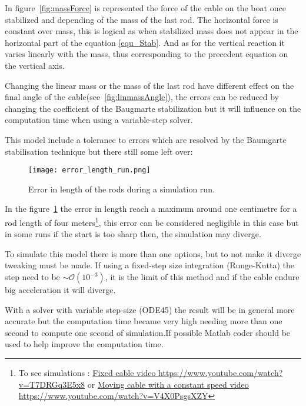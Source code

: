 In figure~\ref{fig:massForce} is represented the force of the cable on the boat once stabilized and depending of the mass of the last rod. The horizontal force is constant over mass, this is logical as when stabilized mass does not appear in the horizontal part of the equation \eqref{equ_Stab}. And as for the vertical reaction it varies linearly with the mass, thus corresponding to the precedent equation on the vertical axis.

Changing the linear mass or the mass of the last rod have different effect on the final angle of the cable(see~\ref{fig:linmassAngle}), the errors can be reduced by changing the coefficient of the Baugmarte stabilization but it will influence on the computation time when using a variable-step solver.

This model include a tolerance to errors which are resolved by the Baumgarte stabilisation technique but there still some left over:


\begin{figure}[H]
\centering
    \texttt{[image: error\_length\_run.png]}
    \caption{Error in length of the rods during a simulation run.}
    \label{fig:errorLRod}
\end{figure}

In the figure~\ref{fig:errorLRod} the error in length reach a maximum around one centimetre for a rod length of four meters\footnote{To see simulations : \href{https://www.youtube.com/watch?v=T7DRGq3E5x8}{Fixed cable video https://www.youtube.com/watch?v=T7DRGq3E5x8} or \href{https://www.youtube.com/watch?v=V4X0PsgsXZY}{Moving cable with a constant speed video https://www.youtube.com/watch?v=V4X0PsgsXZY}}, this error can be considered negligible in this case but in some runs if the start is too sharp then, the simulation may diverge.

To simulate this model there is more than one options, but to not make it diverge tweaking must be made.
If using a fixed-step size integration (Runge-Kutta) the step need to be $\sim\mathcal{O}(10^{-3})$, it is the limit of this method and if the cable endure big acceleration it will diverge.

With a solver with variable step-size (ODE45) the result will be in general more accurate but the computation time became very high needing more than one second to compute one second of simulation.If possible Matlab coder should be used to help improve the computation time.